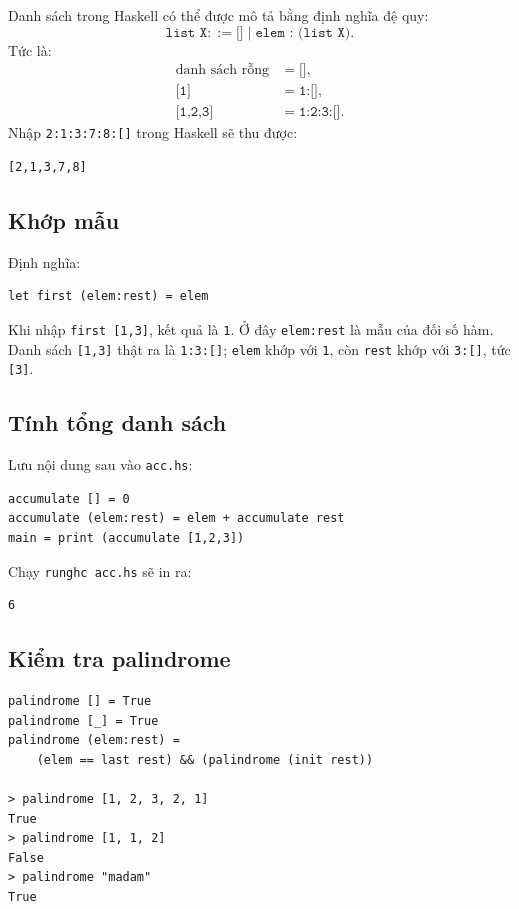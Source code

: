 \documentclass[11pt]{article}
\newcommand{\defeq}{\mathrel{::=}}
\begin{document}
Danh sách trong Haskell có thể được mô tả bằng định nghĩa đệ quy:
\[
  \texttt{list X} \defeq \texttt{[]} \mid
  \texttt{elem : (list X)}.
\]
Tức là:
\[
\begin{aligned}
\text{danh sách rỗng} &= \texttt{[]},\\
\texttt{[1]} &= \texttt{1:[]},\\
\texttt{[1,2,3]} &= \texttt{1:2:3:[]}.
\end{aligned}
\]
Nhập \texttt{2:1:3:7:8:[]} trong Haskell sẽ thu được:
\begin{verbatim}
[2,1,3,7,8]
\end{verbatim}

\subsection{Khớp mẫu}

Định nghĩa:
\begin{verbatim}
let first (elem:rest) = elem
\end{verbatim}
Khi nhập \texttt{first [1,3]}, kết quả là \texttt{1}. Ở đây
\texttt{elem:rest} là mẫu của đối số hàm. Danh sách \texttt{[1,3]} thật ra là
\texttt{1:3:[]}; \texttt{elem} khớp với \texttt{1}, còn \texttt{rest} khớp
với \texttt{3:[]}, tức \texttt{[3]}.

\subsection{Tính tổng danh sách}

Lưu nội dung sau vào \texttt{acc.hs}:
\begin{verbatim}
accumulate [] = 0
accumulate (elem:rest) = elem + accumulate rest
main = print (accumulate [1,2,3])
\end{verbatim}
Chạy \texttt{runghc acc.hs} sẽ in ra:
\begin{verbatim}
6
\end{verbatim}

\subsection{Kiểm tra palindrome}

\begin{verbatim}
palindrome [] = True
palindrome [_] = True
palindrome (elem:rest) =
    (elem == last rest) && (palindrome (init rest))

> palindrome [1, 2, 3, 2, 1]
True
> palindrome [1, 1, 2]
False
> palindrome "madam"
True
\end{verbatim}
\end{document}
